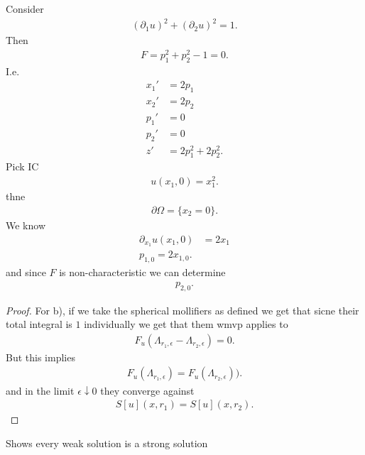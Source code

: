 \begin{example}
 Consider
 \begin{align*}
   (\partial_1 u)^2 + (\partial_2 u)^2 = 1
 .\end{align*}
 Then 
 \begin{align*}
  F = p_{1}^2 + p_{2}^2 -1 = 0
 .\end{align*}
 I.e. 
 \begin{align*}
   x_{1}'  &= 2p_{1}\\
   x_{2}' &= 2p_{2}\\
   p_{1}' &= 0  \\ 
   p_{2}' &= 0 \\
   z' &= 2p_{1}^2 + 2p_{2}^2
  .\end{align*}
  Pick IC 
  \begin{align*}
    u(x_{1},0) = x_{1}^2
  .\end{align*}
  thne 
  \begin{align*}
    \partial \Omega  = \{x_{2}=0\}  
  .\end{align*}
  We know 
  \begin{align*}
    \partial_{x_{1}} u(x_{1},0) &= 2x_{1} \\
    p_{1,0} = 2x_{1,0}
  .\end{align*}
  and since $F$ is non-characteristic we can determine 
  \begin{align*}
    p_{2,0}
  .\end{align*}
\end{example}
\begin{Theorem}[3.6]
  
\end{Theorem}
\begin{proof}
 For b), if we take the spherical mollifiers as defined we get that sicne their total integral is $1$ individually we get that them wmvp applies to 
 \begin{align*}
   F_u(\Lambda_{r_{1},\epsilon} - \Lambda_{r_{2},\epsilon}) = 0
 .\end{align*}
 But this implies 
 \begin{align*}
  F_u(\Lambda_{r_{1},\epsilon}) = F_u(\Lambda_{r_{2},\epsilon}))
 .\end{align*}
 and in the limit $\epsilon \downarrow 0$ they converge against
 \begin{align*}
   S[u](x,r_{1}) = S[u](x,r_{2})
 .\end{align*}
\end{proof}
\begin{Theorem}
 Shows every weak solution is a strong solution
\end{Theorem}
